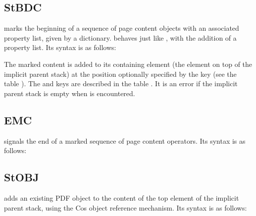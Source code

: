 \documentclass[letterpaper,12pt,english,openany,oneside]{sphinxmanual}
\begin{document}
\subsection{StBDC}
\label{\detokenize{pdfmark_Logical:stbdc}}
 marks the beginning of a sequence of page content objects with an associated property list, given by a dictionary.  behaves just like  , with the addition of a property list. Its syntax is as follows:

\begin{sphinxVerbatim}[commandchars=\\\{\}]
 \PYG{p}{[} 
\PYG{p}{[} 
\PYG{p}{[} 
\PYG{p}{[} 
         
\end{sphinxVerbatim}

The marked content is added to its containing element (the element on top of the implicit parent stack) at the position optionally specified by the  key (see the table ). The  and  keys are described in the table . It is an error if the implicit parent stack is empty when  is encountered.


\subsection{EMC}
\label{\detokenize{pdfmark_Logical:emc}}
 signals the end of a marked sequence of page content operators. Its syntax is as follows:

\begin{sphinxVerbatim}[commandchars=\\\{\}]
\PYG{p}{[}  
\end{sphinxVerbatim}


\subsection{StOBJ}
\label{\detokenize{pdfmark_Logical:stobj}}
 adds an existing PDF object to the content of the top element of the implicit parent stack, using the Cos object reference mechanism. Its syntax is as follows:
\end{document}

